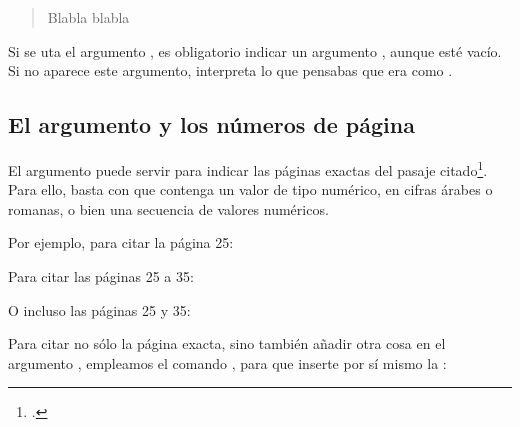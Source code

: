\begin{quotation}
Blabla \cite[Véase también][que trata sobre un tema parecido.]{Saxer1980} blabla
\end{quotation}

\begin{attention}
  Si se uta el argumento , es obligatorio indicar un
  argumento  , aunque esté vacío. Si no aparece este
  argumento,   interpreta lo que pensabas que era
   como .
\end{attention}

\subsection{El argumento  y los números de página}\label{pagespostnote}

El argumento  puede servir para indicar las páginas
exactas del pasaje citado\footcite[Para más detalles, consúltese:
][]{biblatex_pages}. Para ello, basta con que contenga un valor de
tipo numérico, en cifras árabes o romanas, o bien una secuencia de
valores numéricos.

Por ejemplo, para citar la página 25: 

\begin{latexcode}
\autocite[25]{Saxer1980}
\end{latexcode}

 Para citar las páginas 25 a 35:

\begin{latexcode}
\autocite[25-35]{Saxer1980}
\end{latexcode}

O incluso las páginas 25 y 35:

\begin{latexcode}
\autocite[25 \& 35]{Saxer1980}
\end{latexcode}

Para citar no sólo la página exacta, sino también añadir otra cosa en
el argumento , empleamos el comando  ,
para que  inserte por sí mismo la  :

\begin{latexcode}
\autocite[\pno~22,  con el que estamos en desacuerdo.]{Saxer1980}
\end{latexcode}

\begin{quotation}
\cite[\pno~22, con el que estamos en desacuerdo.]{Saxer1980}
\end{quotation}

